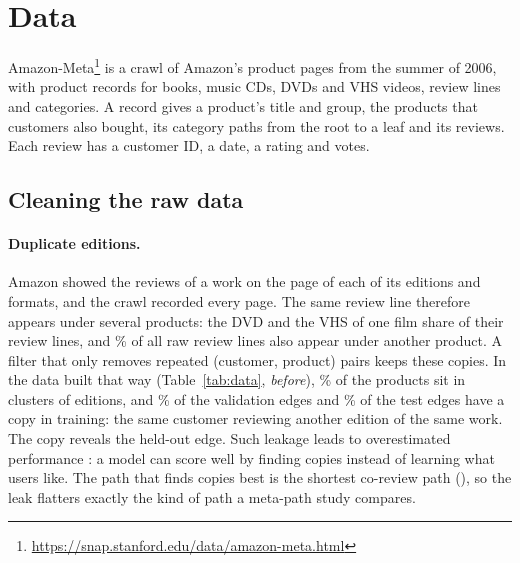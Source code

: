 \section{Data}
\label{sec:data}

Amazon-Meta\footnote{\url{https://snap.stanford.edu/data/amazon-meta.html}}
\citep{leskovec2007viral} is a crawl of Amazon's product pages from the summer of 2006, with
 product records for books, music CDs, DVDs and VHS videos, 
review lines and  categories. A record gives a product's title and group, the
products that customers also bought, its category paths from the root to a leaf and its reviews.
Each review has a customer ID, a date, a rating and votes.

\subsection{Cleaning the raw data}

\paragraph{Duplicate editions.} Amazon showed the reviews of a work on the page of each of its
editions and formats, and the crawl recorded every page. The same review line therefore appears
under several products: the DVD and the VHS of one film share  of their
 review lines, and \% of all raw review lines also appear
under another product. A filter that only removes repeated (customer, product) pairs keeps these
copies. In the data built that way (Table~\ref{tab:data}, \emph{before}),
\% of the products sit in  clusters of editions, and
\% of the validation edges and \% of the test edges
have a copy in training: the same customer reviewing another edition of the same work. The copy
reveals the held-out edge. Such leakage leads to overestimated performance
\citep[\S3.3]{kaufman2012leakage}: a model can score well by finding copies instead of learning
what users like. The path that finds copies best is the shortest co-review path (), so the
leak flatters exactly the kind of path a meta-path study compares.

